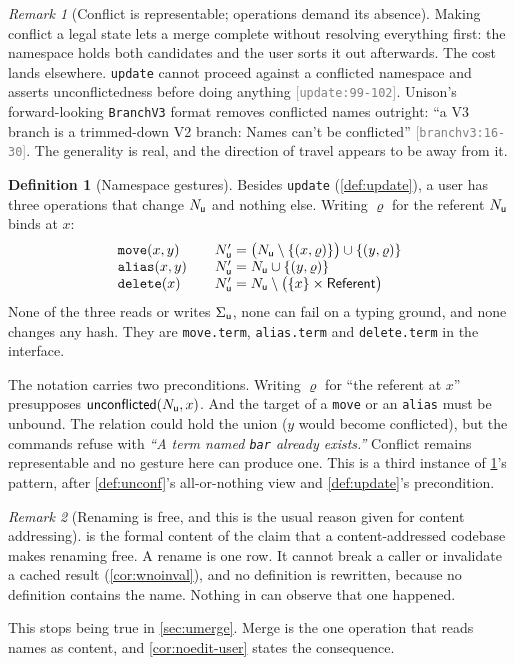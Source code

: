 \documentclass[11pt]{article}
\theoremstyle{definition}
\newtheorem{definition}{Definition}[section]
\theoremstyle{plain}
\theoremstyle{remark}
\newtheorem{remark}{Remark}[section]
\newcommand{\src}[1]{{\footnotesize\textcolor{gray}{[\texttt{#1}]}}}
\begin{document}
\begin{remark}[Conflict is representable; operations demand its absence]\label{rem:conflict}
Making conflict a legal state lets a merge complete without resolving everything first: the namespace
holds both candidates and the user sorts it out afterwards. The cost lands elsewhere. \texttt{update}
cannot proceed against a conflicted namespace and asserts unconflictedness before doing anything
\src{update:99-102}. Unison's forward-looking \texttt{BranchV3} format removes conflicted names
outright: ``a V3 branch is a trimmed-down V2 branch: Names can't be conflicted''
\src{branchv3:16-30}. The generality is real, and the direction of travel appears to be away from it.
\end{remark}

\begin{definition}[Namespace gestures]\label{def:gestures}
Besides \texttt{update} (\cref{def:update}), a user has three operations that change $N_{\mathsf{u}}$ and
nothing else. Writing $\varrho$ for the referent $N_{\mathsf{u}}$ binds at $x$:
\[
\begin{array}{l@{\qquad}l}
  \texttt{move}(x,y)   & \UNames' = \bigl(\UNames \setminus \{(x,\varrho)\}\bigr) \cup \{(y,\varrho)\} \\
  \texttt{alias}(x,y)  & \UNames' = \UNames \cup \{(y,\varrho)\} \\
  \texttt{delete}(x)   & \UNames' = \UNames \setminus \bigl(\{x\} \times \Referent\bigr)
\end{array}
\]
None of the three reads or writes $\Sigma_{\mathsf{u}}$, none can fail on a typing ground, and none changes any
hash. They are \texttt{move.term}, \texttt{alias.term} and \texttt{delete.term} in the interface.

The notation carries two preconditions. Writing $\varrho$ for ``the referent at $x$'' presupposes
$\mathsf{unconflicted}(N_{\mathsf{u}},x)$. And the target of a \texttt{move} or an \texttt{alias} must be unbound. The
relation could hold the union ($y$ would become conflicted), but the commands refuse with \emph{``A
term named \texttt{bar} already exists.''} Conflict remains representable and no gesture here can
produce one. This is a third instance of \cref{rem:conflict}'s pattern, after \cref{def:unconf}'s
all-or-nothing view and \cref{def:update}'s precondition.
\end{definition}

\begin{remark}[Renaming is free, and this is the usual reason given for content addressing]\label{rem:renamefree}
 is the formal content of the claim that a content-addressed codebase makes
renaming free. A rename is one row. It cannot break a caller or invalidate a cached result
(\cref{cor:wnoinval}), and no definition is rewritten, because no definition contains the name.
Nothing in  can observe that one happened.

This stops being true in \cref{sec:umerge}. Merge is the one operation that reads names as content,
and \cref{cor:noedit-user} states the consequence.
\end{remark}
\end{document}
